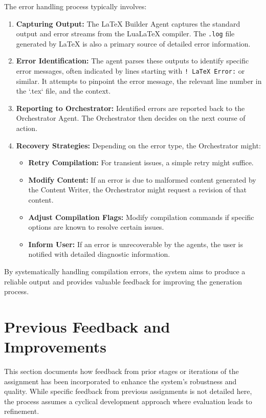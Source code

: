 \documentclass{custom-academic-template}
\begin{document}
The error handling process typically involves:
\begin{enumerate}
    \item 	\textbf{Capturing Output:} The LaTeX Builder Agent captures the standard output and error streams from the LuaLaTeX compiler. The 	\texttt{.log} file generated by LaTeX is also a primary source of detailed error information.
    \item 	\textbf{Error Identification:} The agent parses these outputs to identify specific error messages, often indicated by lines starting with 	\texttt{! LaTeX Error:} or similar. It attempts to pinpoint the error message, the relevant line number in the `.tex` file, and the context.
    \item 	\textbf{Reporting to Orchestrator:} Identified errors are reported back to the Orchestrator Agent. The Orchestrator then decides on the next course of action.
    \item 	\textbf{Recovery Strategies:} Depending on the error type, the Orchestrator might:
        \begin{itemize}
            \item 	\textbf{Retry Compilation:} For transient issues, a simple retry might suffice.
            \item 	\textbf{Modify Content:} If an error is due to malformed content generated by the Content Writer, the Orchestrator might request a revision of that content.
            \item 	\textbf{Adjust Compilation Flags:} Modify compilation commands if specific options are known to resolve certain issues.
            \item 	\textbf{Inform User:} If an error is unrecoverable by the agents, the user is notified with detailed diagnostic information.
        \end{itemize}
\end{enumerate}
By systematically handling compilation errors, the system aims to produce a reliable output and provides valuable feedback for improving the generation process.

\section{Previous Feedback and Improvements}
This section documents how feedback from prior stages or iterations of the assignment has been incorporated to enhance the system's robustness and quality. While specific feedback from previous assignments is not detailed here, the process assumes a cyclical development approach where evaluation leads to refinement.
\end{document}
